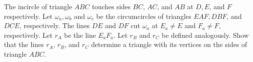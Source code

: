 The incircle of triangle $ABC$ touches sides $BC$,  $AC$,  and $AB$ at $D, E$,  and $F$ respectively. Let $\omega_a, \omega_b$ and $\omega_c$ be the circumcircles of triangles $EAF, DBF$,  and $DCE$,  respectively. The lines $DE$ and $DF$ cut $\omega_a$ at $E_a\neq{E}$ and $F_a\neq{F}$,  respectively. Let $r_A$ be the line $E_{a}F_a$. Let $r_B$ and $r_C$ be defined analogously. Show that the lines $r_A$,  $r_B$,  and $r_C$ determine a triangle with its vertices on the sides of triangle $ABC$.